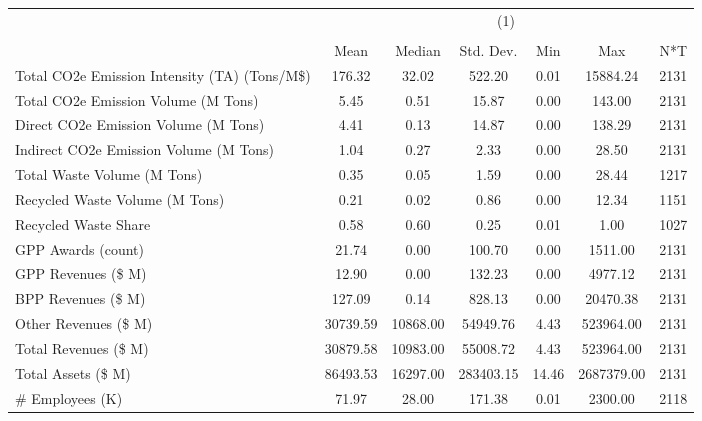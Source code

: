 {
\def\sym#1{\ifmmode^{#1}\else\(^{#1}\)\fi}
\begin{tabular}{l*{1}{cccccc}}
\hline\hline
                    &\multicolumn{6}{c}{(1)}                                                      \\
                    &\multicolumn{6}{c}{}                                                         \\
                    &        Mean&      Median&   Std. Dev.&         Min&         Max&         N*T\\
\hline
Total CO2e Emission Intensity (TA) (Tons/M\$)&      176.32&       32.02&      522.20&        0.01&    15884.24&        2131\\
Total CO2e Emission Volume (M Tons)&        5.45&        0.51&       15.87&        0.00&      143.00&        2131\\
Direct CO2e Emission Volume (M Tons)&        4.41&        0.13&       14.87&        0.00&      138.29&        2131\\
Indirect CO2e Emission Volume (M Tons)&        1.04&        0.27&        2.33&        0.00&       28.50&        2131\\
Total Waste Volume (M Tons)&        0.35&        0.05&        1.59&        0.00&       28.44&        1217\\
Recycled Waste Volume (M Tons)&        0.21&        0.02&        0.86&        0.00&       12.34&        1151\\
Recycled Waste Share&        0.58&        0.60&        0.25&        0.01&        1.00&        1027\\
GPP Awards (count)  &       21.74&        0.00&      100.70&        0.00&     1511.00&        2131\\
GPP Revenues (\$ M) &       12.90&        0.00&      132.23&        0.00&     4977.12&        2131\\
BPP Revenues (\$ M) &      127.09&        0.14&      828.13&        0.00&    20470.38&        2131\\
Other Revenues (\$ M)&    30739.59&    10868.00&    54949.76&        4.43&   523964.00&        2131\\
Total Revenues (\$ M)&    30879.58&    10983.00&    55008.72&        4.43&   523964.00&        2131\\
Total Assets (\$ M) &    86493.53&    16297.00&   283403.15&       14.46&  2687379.00&        2131\\
\# Employees (K)    &       71.97&       28.00&      171.38&        0.01&     2300.00&        2118\\

\end{tabular}}
